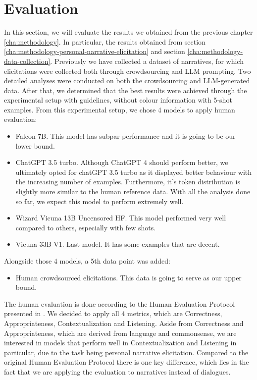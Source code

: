 \chapter{Evaluation}
\label{cha:evaluation}

In this section, we will evaluate the results we obtained from the previous chapter \ref{cha:methodology}. In particular, the results obtained from section \ref{cha:methodology-personal-narrative-elicitation} and section \ref{cha:methodology-data-collection}. 
Previously we have collected a dataset of narratives, for which elicitations were collected both through crowdsourcing and LLM prompting.
Two detailed analyses were conducted on both the crowdsourcing and LLM-generated data. After that, we determined that the best results were achieved through the experimental setup with guidelines, without colour information with 5-shot examples. 
From this experimental setup, we chose 4 models to apply human evaluation:
\begin{itemize}
    \item Falcon 7B. This model has subpar performance and it is going to be our lower bound.
    \item ChatGPT 3.5 turbo. Although ChatGPT 4 should perform better, we ultimately opted for chatGPT 3.5 turbo as it displayed better behaviour with the increasing number of examples. Furthermore, it's token distribution is slightly more similar to the human reference data. With all the analysis done so far, we expect this model to perform extremely well.
    \item Wizard Vicuna 13B Uncensored HF. This model performed very well compared to others, especially with few shots.
    \item Vicuna 33B V1. Last model. It has some examples that are decent.
\end{itemize}
Alongside those 4 models, a 5th data point was added:
\begin{itemize}
    \item Human crowdsourced elicitations. This data is going to serve as our upper bound.
\end{itemize}
The human evaluation is done according to the Human Evaluation Protocol presented in \cite{mousavi-etal-2022-evaluation}. We decided to apply all 4 metrics, which are Correctness, Appropriateness, Contextualization and Listening. Aside from Correctness and Appropriateness, which are derived from language and commonsense, we are interested in models that perform well in Contextualization and Listening in particular, due to the task being personal narrative elicitation. Compared to the original Human Evaluation Protocol there is one key difference, which lies in the fact that we are applying the evaluation to narratives instead of dialogues. 


